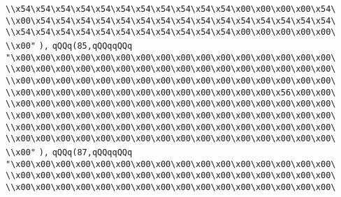\verb|\\x54\x54\x54\x54\x54\x54\x54\x54\x54\x54\x54\x00\x00\x00\x00\x54\|\newline
\verb|\\x00\x54\x54\x54\x54\x54\x54\x54\x54\x54\x54\x54\x54\x54\x54\x54\|\newline
\verb|\\x54\x54\x54\x54\x54\x54\x54\x54\x54\x54\x54\x00\x00\x00\x00\x00\|\newline
\verb|\\x00"|\newline
\verb|),|\newline
\verb|qQQq(85,qQQqqQQq|\newline
\verb|"\x00\x00\x00\x00\x00\x00\x00\x00\x00\x00\x00\x00\x00\x00\x00\x00\|\newline
\verb|\\x00\x00\x00\x00\x00\x00\x00\x00\x00\x00\x00\x00\x00\x00\x00\x00\|\newline
\verb|\\x00\x00\x00\x00\x00\x00\x00\x00\x00\x00\x00\x00\x00\x00\x00\x00\|\newline
\verb|\\x00\x00\x00\x00\x00\x00\x00\x00\x00\x00\x00\x00\x00\x56\x00\x00\|\newline
\verb|\\x00\x00\x00\x00\x00\x00\x00\x00\x00\x00\x00\x00\x00\x00\x00\x00\|\newline
\verb|\\x00\x00\x00\x00\x00\x00\x00\x00\x00\x00\x00\x00\x00\x00\x00\x00\|\newline
\verb|\\x00\x00\x00\x00\x00\x00\x00\x00\x00\x00\x00\x00\x00\x00\x00\x00\|\newline
\verb|\\x00\x00\x00\x00\x00\x00\x00\x00\x00\x00\x00\x00\x00\x00\x00\x00\|\newline
\verb|\\x00"|\newline
\verb|),|\newline
\verb|qQQq(87,qQQqqQQq|\newline
\verb|"\x00\x00\x00\x00\x00\x00\x00\x00\x00\x00\x00\x00\x00\x00\x00\x00\|\newline
\verb|\\x00\x00\x00\x00\x00\x00\x00\x00\x00\x00\x00\x00\x00\x00\x00\x00\|\newline
\verb|\\x00\x00\x00\x00\x00\x00\x00\x00\x00\x00\x00\x00\x00\x00\x00\x00\|\newline

